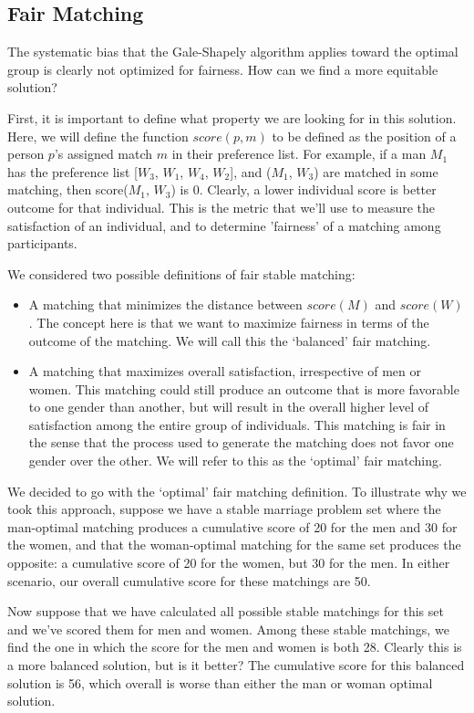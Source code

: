 \documentclass[a4paper]{article}
\begin{document}
\subsection{Fair Matching}
The systematic bias that the Gale-Shapely algorithm applies toward the optimal group is clearly not optimized for fairness. How can we find a more equitable solution?

First, it is important to define what property we are looking for in this solution. Here, we will define the function $score(p, m)$ to be defined as the position of a person $p$'s assigned match $m$ in their preference list. For example, if a man $M_1$ has the preference list [$W_3$, $W_1$, $W_4$, $W_2$], and ($M_1$, $W_3$) are matched in some matching, then score($M_1$, $W_3$) is $0$. Clearly, a lower individual score is better outcome for that individual. This is the metric that we'll use to measure the satisfaction of an individual, and to determine 'fairness' of a matching among participants.

We considered two possible definitions of fair stable matching:
\begin{itemize}
    \item A matching that minimizes the distance between $score(M)$ and $score(W)$. The concept here is that we want to maximize fairness in terms of the outcome of the matching. We will call this the `balanced' fair matching.
    \item A matching that maximizes overall satisfaction, irrespective of men or women. This matching could still produce an outcome that is more favorable to one gender than another, but will result in the overall higher level of satisfaction among the entire group of individuals. This matching is fair in the sense that the process used to generate the matching does not favor one gender over the other. We will refer to this as the `optimal' fair matching.
\end{itemize}

We decided to go with the `optimal' fair matching definition. To illustrate why we took this approach, suppose we have a stable marriage problem set where the man-optimal matching produces a cumulative score of 20 for the men and 30 for the women, and that the woman-optimal matching for the same set produces the opposite: a cumulative score of 20 for the women, but 30 for the men.  In either scenario, our overall cumulative score for these matchings are 50.

Now suppose that we have calculated all possible stable matchings for this set and we've scored them for men and women. Among these stable matchings, we find the one in which the score for the men and women is both 28. Clearly this is a more balanced solution, but is it better? The cumulative score for this balanced solution is 56, which overall is worse than either the man or woman optimal solution.
\end{document}
